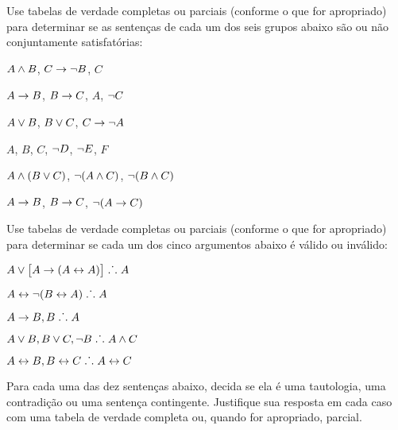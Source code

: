 \solutions
\problempart
\label{pr.TT.satisfiable4}
Use tabelas de verdade completas ou parciais (conforme o que for apropriado) para determinar se as sentenças de cada um dos seis grupos abaixo são ou não conjuntamente satisfatórias:
\begin{earg}
\item $A \wedge B$, $C\rightarrow \neg B$, $C$ %
\item $A\rightarrow B$, $B\rightarrow C$, $A$, $\neg C$ %
\item $A \vee B$, $B\vee C$, $C\rightarrow \neg A$ %
\item $A$, $B$, $C$, $\neg D$, $\neg E$, $F$ %
\item $A \wedge (B \vee C)$, $\neg(A \wedge C)$, $\neg(B \wedge C)$ %
\item $A \rightarrow B$, $B \rightarrow C$, $\neg(A \rightarrow C)$ %
\end{earg}

\solutions
\problempart
\label{pr.TT.valid4}
Use tabelas de verdade completas ou parciais (conforme o que for apropriado) para determinar se cada um dos cinco argumentos abaixo é válido ou inválido:
\begin{earg}
\item $A\vee\bigl[A\rightarrow(A\leftrightarrow A)\bigr] \mathrel{\ldotp\dot{}\,\ldotp} A$ %
\item $A\leftrightarrow\neg(B\leftrightarrow A) \mathrel{\ldotp\dot{}\,\ldotp} A$ %
\item $A\rightarrow B, B \mathrel{\ldotp\dot{}\,\ldotp} A$ %
\item $A\vee B, B\vee C, \neg B \mathrel{\ldotp\dot{}\,\ldotp} A \wedge C$ %
\item $A\leftrightarrow B, B\leftrightarrow C \mathrel{\ldotp\dot{}\,\ldotp} A\leftrightarrow C$ %
\end{earg}

\problempart
\label{pr.TT.TTorC3}
Para cada uma das dez sentenças abaixo, decida se ela é uma tautologia, uma contradição ou uma sentença contingente.
Justifique sua resposta em cada caso com uma tabela de verdade completa ou, quando for apropriado, parcial.


